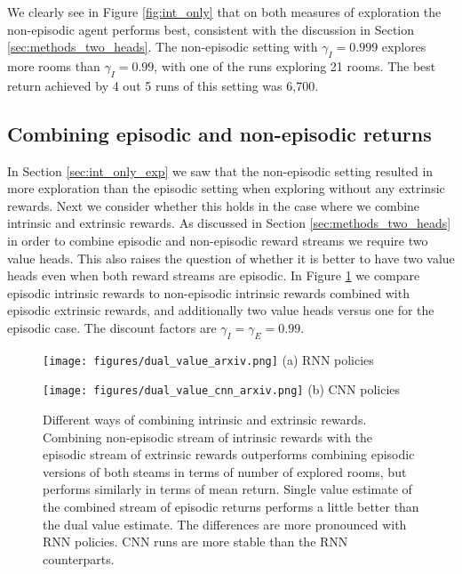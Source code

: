 \documentclass{article} \usepackage[dvipsnames]{xcolor}
\begin{document}
We clearly see in Figure \ref{fig:int_only} that on both measures of exploration the non-episodic agent performs best, consistent with the discussion in Section \ref{sec:methods_two_heads}. The non-episodic setting with $\gamma_I = 0.999$ explores more rooms than $\gamma_I = 0.99$, with one of the runs exploring 21 rooms. The best return achieved by 4 out 5 runs of this setting was 6,700. 

\subsection{Combining episodic and non-episodic returns}
\label{sec:exp_episodic}
In Section \ref{sec:int_only_exp} we saw that the non-episodic setting resulted in more exploration than the episodic setting when exploring without any extrinsic rewards. Next we consider whether this holds in the case where we combine intrinsic and extrinsic rewards. As discussed in Section \ref{sec:methods_two_heads} in order to combine episodic and non-episodic reward streams we require two value heads. This also raises the question of whether it is better to have two value heads even when both reward streams are episodic. In Figure \ref{fig:dual_value} we compare episodic intrinsic rewards to non-episodic intrinsic rewards combined with episodic extrinsic rewards, and additionally two value heads versus one for the episodic case. The discount factors are $\gamma_I = \gamma_E = 0.99$.

\begin{figure}[htbp]
\begin{minipage}{.48\textwidth}
\centering
\texttt{[image: figures/dual\_value\_arxiv.png]}
(a) RNN policies
\end{minipage}\hspace{.02\textwidth}
\begin{minipage}{.48\textwidth}
\centering
\texttt{[image: figures/dual\_value\_cnn\_arxiv.png]}
(b) CNN policies
\end{minipage}\vspace*{-4pt}
\caption{Different ways of combining intrinsic and extrinsic rewards. Combining non-episodic stream of intrinsic rewards with the episodic stream of extrinsic rewards outperforms combining episodic versions of both steams in terms of number of  explored rooms, but performs similarly in terms of mean return. Single value estimate of the combined stream of episodic returns performs a little better than the dual value estimate. The differences are more pronounced with RNN policies. CNN runs are more stable than the RNN counterparts.}
\label{fig:dual_value}
\end{figure}
\end{document}
